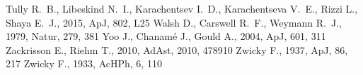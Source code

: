\documentclass[paper=a4, fontsize=11pt]{scrartcl} %
\numberwithin{equation}{section} %
\numberwithin{figure}{section} %
\numberwithin{table}{section} %
\begin{document}
\begin{thebibliography}{}
Tully R.~B., Libeskind N.~I., Karachentsev I.~D., Karachentseva V.~E., 
Rizzi L., Shaya E.~J., 2015, ApJ, 802, L25 
 Walsh D., Carswell R.~F., Weymann R.~J., 1979, Natur, 279, 381 
 Yoo J., Chanam{\'e} J., Gould A., 2004, ApJ, 601, 311 
 Zackrisson E., Riehm T., 2010, AdAst, 2010, 478910 
 Zwicky 
F., 1937, ApJ, 86, 217 
 Zwicky 
F., 1933, AcHPh, 6, 110
\end{thebibliography}
\end{document}
